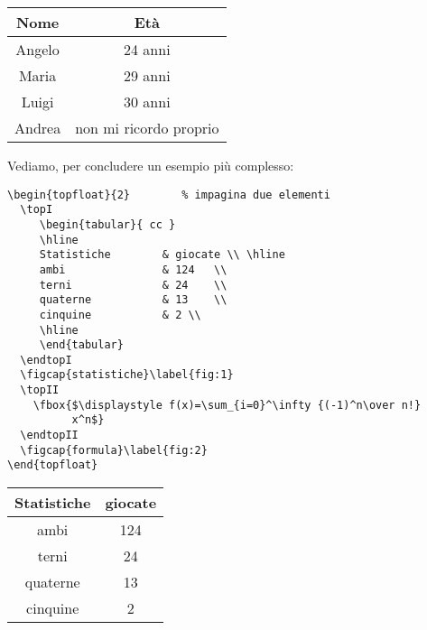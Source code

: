 \documentclass[a4paper,twoside]{article}
\begin{document}
\begin{topfloat}{1}     %
   \topI
       \begin{tabular}{|c|c|} 
                \hline
                Nome    & Et\`a \\ \hline
                Angelo  & 24 anni \\
                Maria   & 29 anni \\
                Luigi   & 30 anni \\
                Andrea  & non mi ricordo proprio \\
                \hline
       \end{tabular}
   \endtopI
   \label{tab:3}
\end{topfloat}

\noindent Vediamo, per concludere un esempio pi\`u complesso:

\begin{verbatim}
\begin{topfloat}{2}        % impagina due elementi
  \topI
     \begin{tabular}{ cc }
     \hline
     Statistiche        & giocate \\ \hline
     ambi               & 124   \\
     terni              & 24    \\
     quaterne           & 13    \\
     cinquine           & 2 \\
     \hline
     \end{tabular}
  \endtopI
  \figcap{statistiche}\label{fig:1}
  \topII
    \fbox{$\displaystyle f(x)=\sum_{i=0}^\infty {(-1)^n\over n!}
          x^n$}
  \endtopII
  \figcap{formula}\label{fig:2}
\end{topfloat}
\end{verbatim}

\begin{topfloat}{2}        %
  \topI
     \begin{tabular}{ cc }
     \hline
     Statistiche        & giocate \\ \hline
     ambi               & 124   \\
     terni              & 24    \\
     quaterne           & 13    \\
     cinquine           & 2 \\
     \hline
     \end{tabular}
  \endtopI
  \label{fig:1}
  \topII
  \endtopII
  \label{fig:2}
\end{topfloat}
\end{document}
